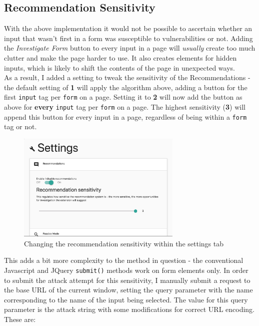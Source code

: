 \subsection{Recommendation Sensitivity}

With the above implementation it would not be possible to ascertain whether an input that wasn't first in a form was susceptible to vulnerabilities or not. Adding the \textit{Investigate Form} button to every input in a page will \textit{usually} create too much clutter and make the page harder to use. It also creates elements for hidden inputs, which is likely to shift the contents of the page in unexpected ways. \\

As a result, I added a setting to tweak the sensitivity of the Recommendations - the default setting of \textbf{1} will apply the algorithm above, adding a button for the first \texttt{input} tag per \texttt{form} on a page. Setting it to \textbf{2} will now add the button as above for \textbf{every} \texttt{input} tag per \texttt{form} on a page. The highest sensitivity (\textbf{3}) will append this button for every input in a page, regardless of being within a \texttt{form} tag or not. \\

\begin{figure}[h]
	\centering
	\includegraphics[width=0.7\textwidth]{images/tweaking_recommender_sensitivity.png}
	\caption{Changing the recommendation sensitivity within the settings tab}
	\label{fig:test}
\end{figure}

This adds a bit more complexity to the method in question - the conventional Javascript and JQuery \texttt{submit()} methods work on form elements only. In order to submit the attack attempt for this sensitivity, I manually submit a request to the base URL of the current window, setting the query parameter with the name corresponding to the name of the input being selected. The value for this query parameter is the attack string with some modifications for correct URL encoding. These are:

